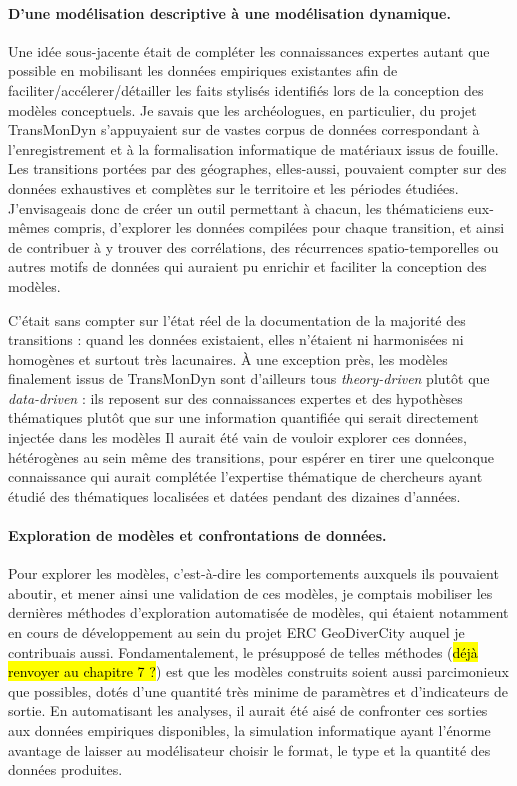 \paragraph{D'une modélisation descriptive à une modélisation dynamique.}
Une idée sous-jacente était de compléter les connaissances expertes autant que possible en mobilisant les données empiriques existantes afin de faciliter/accélerer/détailler les faits stylisés identifiés lors de la conception des modèles conceptuels.
Je savais que les archéologues, en particulier, du projet TransMonDyn s'appuyaient sur de vastes corpus de données correspondant à l'enregistrement et à la formalisation informatique de matériaux issus de fouille.
Les transitions portées par des géographes, elles-aussi, pouvaient compter sur des données exhaustives et complètes sur le territoire et les périodes étudiées.
J'envisageais donc de créer un outil permettant à chacun, les thématiciens eux-mêmes compris, d'explorer les données compilées pour chaque transition, et ainsi de contribuer à y trouver des corrélations, des récurrences spatio-temporelles ou autres motifs de données qui auraient pu enrichir et faciliter la conception des modèles.

C'était sans compter sur l'état réel de la documentation de la majorité des transitions : quand les données existaient, elles n'étaient ni harmonisées ni homogènes et surtout très lacunaires.
À une exception près, les modèles finalement issus de TransMonDyn sont d'ailleurs tous \og \textit{theory-driven}\fg{} plutôt que \og \textit{data-driven}\fg{} : ils reposent sur des connaissances expertes et des hypothèses thématiques plutôt que sur une information quantifiée qui serait directement injectée dans les modèles
Il aurait été vain de vouloir explorer ces données, hétérogènes au sein même des transitions, pour espérer en tirer une quelconque connaissance qui aurait complétée l'expertise thématique de chercheurs ayant étudié des thématiques localisées et datées pendant des dizaines d'années.

\paragraph{Exploration de modèles et confrontations de données.}
Pour explorer les modèles, c'est-à-dire les comportements auxquels ils pouvaient aboutir, et mener ainsi une validation de ces modèles, je comptais mobiliser les dernières méthodes d'exploration automatisée de modèles, qui étaient notamment en cours de développement au sein du projet ERC GeoDiverCity auquel je contribuais aussi.
Fondamentalement, le présupposé de telles méthodes (\hl{déjà renvoyer au chapitre 7 ?}) est que les modèles construits soient aussi parcimonieux que possibles, dotés d'une quantité très minime de paramètres et d'indicateurs de sortie.
En automatisant les analyses, il aurait été aisé de confronter ces sorties aux données empiriques disponibles, la simulation informatique ayant l'énorme avantage de laisser au modélisateur choisir le format, le type et la quantité des données produites.

